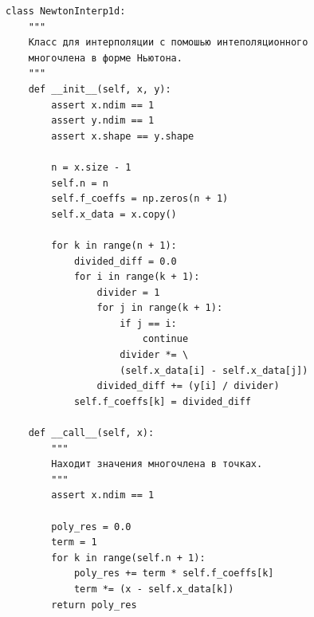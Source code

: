 \documentclass[12pt]{article}%
\begin{document}
\begin{verbatim}
class NewtonInterp1d:
    """
    Класс для интерполяции с помошью интеполяционного 
    многочлена в форме Ньютона.
    """
    def __init__(self, x, y):
        assert x.ndim == 1
        assert y.ndim == 1
        assert x.shape == y.shape

        n = x.size - 1
        self.n = n
        self.f_coeffs = np.zeros(n + 1)
        self.x_data = x.copy()

        for k in range(n + 1):
            divided_diff = 0.0
            for i in range(k + 1):
                divider = 1
                for j in range(k + 1):
                    if j == i:
                        continue
                    divider *= \ 
                    (self.x_data[i] - self.x_data[j])
                divided_diff += (y[i] / divider)
            self.f_coeffs[k] = divided_diff 
    
    def __call__(self, x):
        """
        Находит значения многочлена в точках. 
        """
        assert x.ndim == 1

        poly_res = 0.0
        term = 1
        for k in range(self.n + 1):
            poly_res += term * self.f_coeffs[k]
            term *= (x - self.x_data[k])
        return poly_res
\end{verbatim}

\newpage
\end{document}
